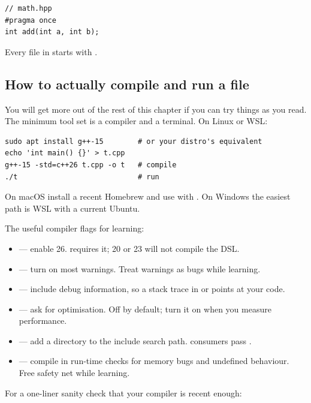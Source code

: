 \begin{lstlisting}
// math.hpp
#pragma once
int add(int a, int b);
\end{lstlisting}

Every file in \maya{} starts with .

\subsection{How to actually compile and run a \cpp{} file}

You will get more out of the rest of this chapter if you can try
things as you read. The minimum tool set is a compiler and a
terminal. On Linux or WSL:

\begin{lstlisting}[style=shell]
sudo apt install g++-15        # or your distro's equivalent
echo 'int main() {}' > t.cpp
g++-15 -std=c++26 t.cpp -o t   # compile
./t                            # run
\end{lstlisting}

On macOS install a recent Homebrew  and use 
with . On Windows the easiest path is WSL with a
current Ubuntu.

The useful compiler flags for learning:

\begin{itemize}[leftmargin=*]
  \item {} --- enable \cpp{}26. \maya{} requires it;
    \cpp{}20 or \cpp{}23 will not compile the DSL.
  \item {} --- turn on most warnings. Treat
    warnings as bugs while learning.
  \item {} --- include debug information, so a stack trace
    in  or  points at your code.
  \item {} --- ask for optimisation. Off by default; turn
    it on when you measure performance.
  \item {} --- add a directory to the
    include search path. \maya{} consumers pass
    .
  \item {} --- compile in run-time
    checks for memory bugs and undefined behaviour. Free safety
    net while learning.
\end{itemize}

For a one-liner sanity check that your compiler is recent enough:

